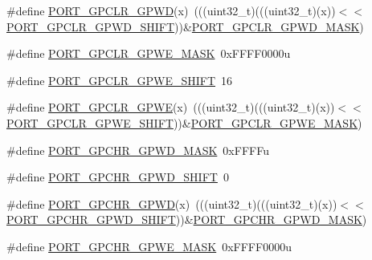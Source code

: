 \begin{DoxyCompactItemize}
\item 
\#define \hyperlink{group___p_o_r_t___register___masks_gae13a63b19950557e19c9a884f3d3b77a}{P\+O\+R\+T\+\_\+\+G\+P\+C\+L\+R\+\_\+\+G\+P\+WD}(x)~(((uint32\+\_\+t)(((uint32\+\_\+t)(x))$<$$<$\hyperlink{group___p_o_r_t___register___masks_gaafacaac0aa215f596b947609857d6491}{P\+O\+R\+T\+\_\+\+G\+P\+C\+L\+R\+\_\+\+G\+P\+W\+D\+\_\+\+S\+H\+I\+FT}))\&\hyperlink{group___p_o_r_t___register___masks_gaa7e4a890e9d09d85279889ce3ecb0044}{P\+O\+R\+T\+\_\+\+G\+P\+C\+L\+R\+\_\+\+G\+P\+W\+D\+\_\+\+M\+A\+SK})
\item 
\#define \hyperlink{group___p_o_r_t___register___masks_ga49c4160370859546837be80a2eed1365}{P\+O\+R\+T\+\_\+\+G\+P\+C\+L\+R\+\_\+\+G\+P\+W\+E\+\_\+\+M\+A\+SK}~0x\+F\+F\+F\+F0000u
\item 
\#define \hyperlink{group___p_o_r_t___register___masks_ga340d6aadd9516b3cac26187b014ce9d3}{P\+O\+R\+T\+\_\+\+G\+P\+C\+L\+R\+\_\+\+G\+P\+W\+E\+\_\+\+S\+H\+I\+FT}~16
\item 
\#define \hyperlink{group___p_o_r_t___register___masks_ga52502515ea180d574d919f0ec155da74}{P\+O\+R\+T\+\_\+\+G\+P\+C\+L\+R\+\_\+\+G\+P\+WE}(x)~(((uint32\+\_\+t)(((uint32\+\_\+t)(x))$<$$<$\hyperlink{group___p_o_r_t___register___masks_ga340d6aadd9516b3cac26187b014ce9d3}{P\+O\+R\+T\+\_\+\+G\+P\+C\+L\+R\+\_\+\+G\+P\+W\+E\+\_\+\+S\+H\+I\+FT}))\&\hyperlink{group___p_o_r_t___register___masks_ga49c4160370859546837be80a2eed1365}{P\+O\+R\+T\+\_\+\+G\+P\+C\+L\+R\+\_\+\+G\+P\+W\+E\+\_\+\+M\+A\+SK})
\item 
\#define \hyperlink{group___p_o_r_t___register___masks_ga4f288d1140184d41384f459c263d6e63}{P\+O\+R\+T\+\_\+\+G\+P\+C\+H\+R\+\_\+\+G\+P\+W\+D\+\_\+\+M\+A\+SK}~0x\+F\+F\+F\+Fu
\item 
\#define \hyperlink{group___p_o_r_t___register___masks_gab4464bb98b737fbf75d42682fef3c09c}{P\+O\+R\+T\+\_\+\+G\+P\+C\+H\+R\+\_\+\+G\+P\+W\+D\+\_\+\+S\+H\+I\+FT}~0
\item 
\#define \hyperlink{group___p_o_r_t___register___masks_ga47cddb6551f05cf4810b6f7d96084540}{P\+O\+R\+T\+\_\+\+G\+P\+C\+H\+R\+\_\+\+G\+P\+WD}(x)~(((uint32\+\_\+t)(((uint32\+\_\+t)(x))$<$$<$\hyperlink{group___p_o_r_t___register___masks_gab4464bb98b737fbf75d42682fef3c09c}{P\+O\+R\+T\+\_\+\+G\+P\+C\+H\+R\+\_\+\+G\+P\+W\+D\+\_\+\+S\+H\+I\+FT}))\&\hyperlink{group___p_o_r_t___register___masks_ga4f288d1140184d41384f459c263d6e63}{P\+O\+R\+T\+\_\+\+G\+P\+C\+H\+R\+\_\+\+G\+P\+W\+D\+\_\+\+M\+A\+SK})
\item 
\#define \hyperlink{group___p_o_r_t___register___masks_ga5e60b77e9d69fc09654c8034e31df7b5}{P\+O\+R\+T\+\_\+\+G\+P\+C\+H\+R\+\_\+\+G\+P\+W\+E\+\_\+\+M\+A\+SK}~0x\+F\+F\+F\+F0000u
$$
\end{DoxyCompactItemize}
